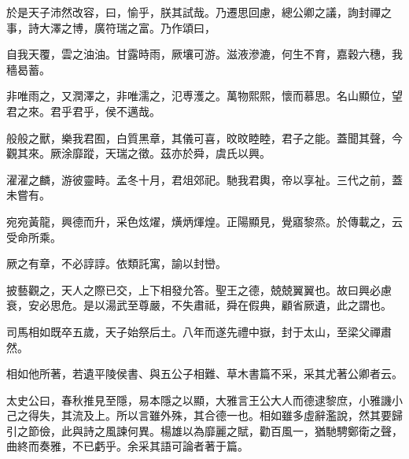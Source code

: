 於是天子沛然改容，曰，愉乎，朕其試哉。乃遷思回慮，總公卿之議，詢封禪之事，詩大澤之博，廣符瑞之富。乃作頌曰，

自我天覆，雲之油油。甘露時雨，厥壤可游。滋液滲漉，何生不育，嘉穀六穗，我穡曷蓄。

非唯雨之，又潤澤之，非唯濡之，氾尃濩之。萬物熙熙，懷而慕思。名山顯位，望君之來。君乎君乎，侯不邁哉。

般般之獸，樂我君囿，白質黑章，其儀可喜，旼旼睦睦，君子之能。蓋聞其聲，今觀其來。厥涂靡蹤，天瑞之徵。茲亦於舜，虞氏以興。

濯濯之麟，游彼靈畤。孟冬十月，君俎郊祀。馳我君輿，帝以享祉。三代之前，蓋未嘗有。

宛宛黃龍，興德而升，采色炫燿，熿炳煇煌。正陽顯見，覺寤黎烝。於傳載之，云受命所乘。

厥之有章，不必諄諄。依類託寓，諭以封巒。

披藝觀之，天人之際已交，上下相發允答。聖王之德，兢兢翼翼也。故曰興必慮衰，安必思危。是以湯武至尊嚴，不失肅祗，舜在假典，顧省厥遺，此之謂也。

司馬相如既卒五歲，天子始祭后土。八年而遂先禮中嶽，封于太山，至梁父禪肅然。

相如他所著，若遺平陵侯書、與五公子相難、草木書篇不采，采其尤著公卿者云。

太史公曰，春秋推見至隱，易本隱之以顯，大雅言王公大人而德逮黎庶，小雅譏小己之得失，其流及上。所以言雖外殊，其合德一也。相如雖多虛辭濫說，然其要歸引之節儉，此與詩之風諫何異。楊雄以為靡麗之賦，勸百風一，猶馳騁鄭衛之聲，曲終而奏雅，不已虧乎。余采其語可論者著于篇。